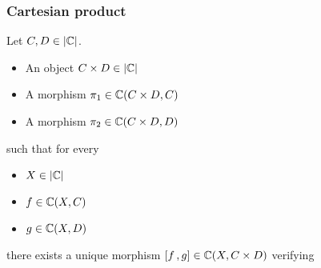 \documentclass[usenames,dvipsnames,rgb]{beamer}
\begin{document}
\begin{frame}[fragile]
  \frametitle{Cartesian product}

  Let $C, D \in \CatObj{\aCategory}$.

  \vfill

  \begin{itemize}
  \item An object $\ProdObj{C}{D} \in \CatObj{\aCategory}$
  \item A morphism
    $\ProdFst \in \CatMorph[\aCategory]{\ProdObj{C}{D}}{C}$
  \item A morphism
    $\ProdSnd \in \CatMorph[\aCategory]{\ProdObj{C}{D}}{D}$
  \end{itemize}
  such that for every
  \begin{itemize}
  \item $X \in \CatObj{\aCategory}$
  \item $f \in \CatMorph[\aCategory]{X}{C}$
  \item $g \in \CatMorph[\aCategory]{X}{D}$
  \end{itemize}
  there exists a unique morphism $\ProdMorph{f}{g} \in \CatMorph[\aCategory]{X}{\ProdObj{C}{D}}$ verifying
  \begin{center}
  \end{center}

  \vfill

\end{frame}


\newcommand{\ExpObj}[2]{\ensuremath{{#1}^{#2}}}
\newcommand{\ExpMorph}[1]{\ensuremath{\lambda\; #1}}
\newcommand{\ExpApply}{\ensuremath{\mathsf{apply}}}
\end{document}
